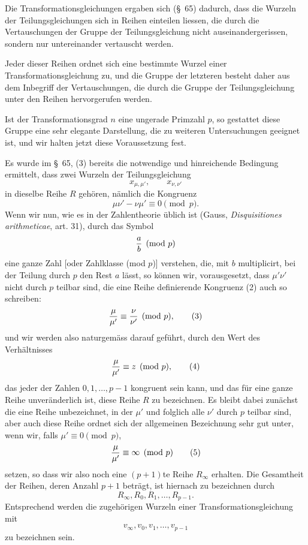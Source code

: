 \documentclass[11pt]{article}
\begin{document}
Die Transformationsgleichungen ergaben sich (\S~65) dadurch, dass die Wurzeln der Teilungsgleichungen sich in Reihen einteilen liessen, die durch die Vertauschungen der Gruppe der Teilungsgleichung nicht auseinandergerissen, sondern nur untereinander vertauscht werden.

Jeder dieser Reihen ordnet sich eine bestimmte Wurzel einer Transformationsgleichung zu, und die Gruppe der letzteren besteht daher aus dem Inbegriff der Vertauschungen, die durch die Gruppe der Teilungsgleichung unter den Reihen hervorgerufen werden.

Ist der Transformationsgrad $n$ eine ungerade Primzahl $p$, so gestattet diese Gruppe eine sehr elegante Darstellung, die zu weiteren Untersuchungen geeignet ist, und wir halten jetzt diese Voraussetzung fest.

Es wurde im \S~65, (3) bereits die notwendige und hinreichende Bedingung ermittelt, dass zwei Wurzeln der Teilungsgleichung
\begin{equation}
 x_{\mu,\mu'},\qquad x_{\nu,\nu'}
\tag{1}
\end{equation}
in dieselbe Reihe $R$ gehören, nämlich die Kongruenz
\begin{equation}
 \mu\nu'-\nu\mu'\equiv0\pmod p.
\tag{2}
\end{equation}
Wenn wir nun, wie es in der Zahlentheorie üblich ist (Gauss, \emph{Disquisitiones arithmeticae}, art. 31), durch das Symbol
\[
 {a\over b}\pmod p
\]
eine ganze Zahl [oder Zahlklasse (mod $p$)] verstehen, die, mit $b$ multiplicirt, bei der Teilung durch $p$ den Rest $a$ lässt, so können wir, vorausgesetzt, dass $\mu'\nu'$ nicht durch $p$ teilbar sind, die eine Reihe definierende Kongruenz (2) auch so schreiben:
\begin{equation}
 {\mu\over \mu'}\equiv {\nu\over \nu'}\pmod p,
\tag{3}
\end{equation}
und wir werden also naturgemäss darauf geführt, durch den Wert des Verhältnisses
\begin{equation}
 {\mu\over \mu'}\equiv z\pmod p,
\tag{4}
\end{equation}
das jeder der Zahlen $0,1,\ldots,p-1$ kongruent sein kann, und das für eine ganze Reihe unveränderlich ist, diese Reihe $R$ zu bezeichnen. Es bleibt dabei zunächst die eine Reihe unbezeichnet, in der $\mu'$ und folglich alle $\nu'$ durch $p$ teilbar sind, aber auch diese Reihe ordnet sich der allgemeinen Bezeichnung sehr gut unter, wenn wir, falls $\mu'\equiv0\pmod p$,
\begin{equation}
 {\mu\over \mu'}\equiv\infty\pmod p
\tag{5}
\end{equation}
setzen, so dass wir also noch eine $(p+1)$te Reihe $R_\infty$ erhalten. Die Gesamtheit der Reihen, deren Anzahl $p+1$ beträgt, ist hiernach zu bezeichnen durch
\begin{equation}
 R_\infty,R_0,R_1,\ldots,R_{p-1}.
\tag{6}
\end{equation}
Entsprechend werden die zugehörigen Wurzeln einer Transformationsgleichung mit
\begin{equation}
 v_\infty,v_0,v_1,\ldots,v_{p-1}
\tag{7}
\end{equation}
zu bezeichnen sein.
\end{document}
